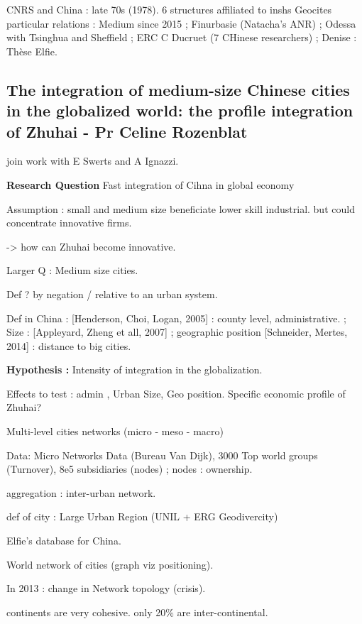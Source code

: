 CNRS and China : late 70s (1978). 6 structures affiliated to inshs
Geocites particular relations : Medium since 2015 ; Finurbasie (Natacha's ANR) ; Odessa with Tsinghua and Sheffield ; ERC C Ducruet (7 CHinese researchers) ; Denise : Thèse Elfie.








\subsection*{The integration of medium-size Chinese cities in the globalized world: the profile integration of Zhuhai - Pr Celine Rozenblat}

join work with E Swerts and A Ignazzi.

\textbf{Research Question} Fast integration of Cihna in global economy

Assumption : small and medium size beneficiate lower skill industrial.
but could concentrate innovative firms.

-> how can Zhuhai become innovative.

Larger Q : Medium size cities.

Def ? by negation / relative to an urban system.

Def in China : [Henderson, Choi, Logan, 2005] : county level, administrative. ; Size : [Appleyard, Zheng et all, 2007] ; geographic position [Schneider, Mertes, 2014] : distance to big cities.

\textbf{Hypothesis : } Intensity of integration in the globalization.

Effects to test : admin , Urban Size, Geo position.
Specific economic profile of Zhuhai?

Multi-level cities networks (micro - meso - macro)

Data: Micro Networks Data (Bureau Van Dijk), 3000 Top world groups (Turnover), 8e5 subsidiaries (nodes) ; nodes : ownership.

aggregation : inter-urban network.

def of city : Large Urban Region (UNIL + ERG Geodivercity)

Elfie's database for China.

World network of cities (graph viz positioning).

In 2013 : change in Network topology (crisis).

continents are very cohesive. only 20\% are inter-continental.

